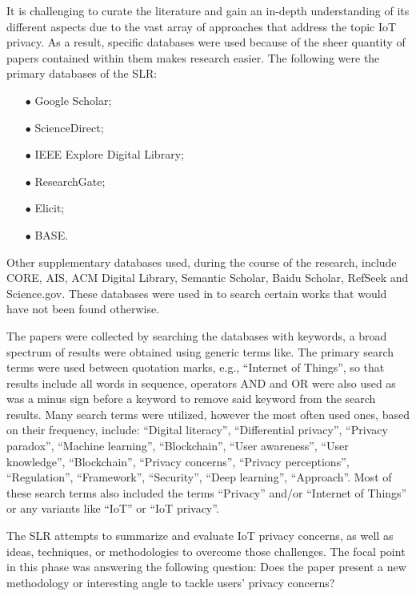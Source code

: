 It is challenging to curate the literature and
gain an in-depth understanding of its different aspects due to the vast
array of approaches that address the topic IoT privacy. As a result, specific
databases were used because of the sheer quantity of papers contained within
them makes research easier. The following were the primary databases of the SLR:

\begin{itemize}
    \item[$\bullet$]
    Google Scholar;
    \item[$\bullet$]
    ScienceDirect;
    \item[$\bullet$]
    IEEE Explore Digital Library;
    \item[$\bullet$]
    ResearchGate;
    \item[$\bullet$]
    Elicit;
    \item[$\bullet$]
    BASE.
\end{itemize}

Other supplementary databases used, during the course of the research, include
CORE, AIS, ACM Digital Library, Semantic Scholar, Baidu Scholar, RefSeek and
Science.gov. These databases were used in to search certain works that
would have not been found otherwise.

The papers were collected by searching the databases with keywords, a broad
spectrum of results were obtained using generic terms like. The primary search
terms were used between quotation marks, e.g., ``Internet of Things'', so that
results include all words in sequence, operators AND and OR were also used
as was a minus sign before a keyword to remove said keyword from the search
results. Many search terms were utilized, however the most often
used ones, based on their frequency, include: ``Digital literacy'',
``Differential privacy'', ``Privacy paradox'', ``Machine learning'',
``Blockchain'', ``User awareness'', ``User knowledge'', ``Blockchain'',
``Privacy concerns'', ``Privacy perceptions'', ``Regulation'',
``Framework'', ``Security'', ``Deep learning'', ``Approach''.
Most of these search terms also included the terms ``Privacy'' and/or
``Internet of Things'' or any variants like ``IoT'' or ``IoT privacy''.

The SLR attempts to summarize and evaluate IoT privacy concerns, as well
as ideas, techniques, or methodologies to overcome those challenges.
The focal point in this phase was answering the following question: Does
the paper present a new methodology or interesting angle to tackle users'
privacy concerns?

